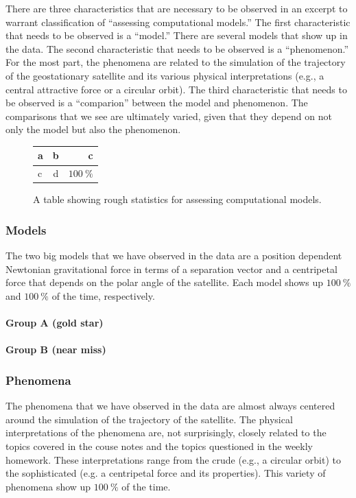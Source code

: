 \documentclass{msuphddissertation}
\begin{document}
\begin{doublespace}
There are three characteristics that are necessary to be observed in an excerpt to warrant classification of ``assessing computational models.''  The first characteristic that needs to be observed is a ``model.''  There are several models that show up in the data.  The second characteristic that needs to be observed is a ``phenomenon.''  For the most part, the phenomena are related to the simulation of the trajectory of the geostationary satellite and its various physical interpretations (e.g., a central attractive force or a circular orbit).  The third characteristic that needs to be observed is a ``comparion'' between the model and phenomenon.  The comparisons that we see are ultimately varied, given that they depend on not only the model but also the phenomenon.

\begin{figure}[ht]\centering
\begin{tabular}{l|c|r}
a & b & c \\\hline
c & d & $\SI{100}{\percent}$ \\
\end{tabular}
\caption{A table showing rough statistics for assessing computational models.}
\end{figure}

\subsubsection{Models}

The two big models that we have observed in the data are a position dependent Newtonian gravitational force in terms of a separation vector and a centripetal force that depends on the polar angle of the satellite.  Each model shows up $\SI{100}{\percent}$ and $\SI{100}{\percent}$ of the time, respectively.

\paragraph{Group A (gold star)}

\paragraph{Group B (near miss)}

\subsubsection{Phenomena}

The phenomena that we have observed in the data are almost always centered around the simulation of the trajectory of the satellite.  The physical interpretations of the phenomena are, not surprisingly, closely related to the topics covered in the couse notes and the topics questioned in the weekly homework.  These interpretations range from the crude (e.g., a circular orbit) to the sophisticated (e.g. a centripetal force and its properties).  This variety of phenomena show up $\SI{100}{\percent}$ of the time.


\end{doublespace}
\end{document}
